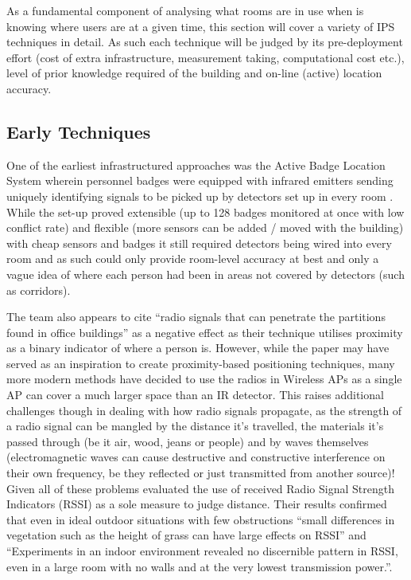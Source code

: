 \documentclass{UoYCSproject}
\begin{document}
            As a fundamental component of analysing what rooms are in use when is knowing where users are at a given time, this section will cover a variety of IPS techniques in detail. As such each technique will be judged by its pre-deployment effort (cost of extra infrastructure, measurement taking, computational cost etc.), level of prior knowledge required of the building and on-line (active) location accuracy.
            
            \subsection{Early Techniques}
            \label{sec:early}
            
                One of the earliest infrastructured approaches was the Active Badge Location System wherein personnel badges were equipped with infrared emitters sending uniquely identifying signals to be picked up by detectors set up in every room \citep{want1992active}. While the set-up proved extensible (up to 128 badges monitored at once with low conflict rate) and flexible (more sensors can be added / moved with the building) with cheap sensors and badges it still required detectors being wired into every room and as such could only provide room-level accuracy at best and only a vague idea of where each person had been in areas not covered by detectors (such as corridors). 
            
                The team also appears to cite ``radio signals that can penetrate the partitions found in office buildings'' as a negative effect as their technique utilises proximity as a binary indicator of where a person is. However, while the paper may have served as an inspiration to create proximity-based positioning techniques, many more modern methods have decided to use the radios in Wireless APs as a single AP can cover a much larger space than an IR detector. This raises additional challenges though in dealing with how radio signals propagate, as the strength of a radio signal can be mangled by the distance it's travelled,  the materials it's passed through (be it air, wood, jeans or people) and by waves themselves (electromagnetic waves can cause destructive and constructive interference on their own frequency, be they reflected or just transmitted from another source)! Given all of these problems \citet{whitehouse2007practical} evaluated the use of received Radio Signal Strength Indicators (RSSI) as a sole measure to judge distance. Their results confirmed that even in ideal outdoor situations with few obstructions ``small differences in vegetation such as the height of grass can have large effects on RSSI'' and ``Experiments in an indoor environment revealed no discernible pattern in RSSI, even in a large room with no walls and at the very lowest transmission power.''.
            
\end{document}
